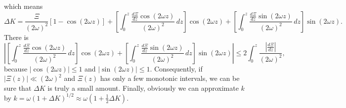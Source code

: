 \documentclass[
 jor,
 amsmath,amssymb,preprint,
]{revtex4-2}
\begin{document}
which means
\begin{equation}
    \Delta K=\frac{\Xi}{(2\omega)^2}[1-\cos(2\omega z)]+\left[\int_{0}^z\frac{\frac{d\Xi}{d z}\cos(2\omega z)}{(2\omega)^2}\,d z\right]\cos(2\omega z)+\left[\int_{0}^z\frac{\frac{d\Xi}{d z}\sin(2\omega z)}{(2\omega)^2}\,d z\right]\sin(2\omega z).
\end{equation}
There is
\begin{equation}
    \left\lvert \left[\int_{0}^z\frac{\frac{d\Xi}{d z}\cos(2\omega z)}{(2\omega)^2}\,d z\right]\cos(2\omega z)+\left[\int_{0}^z\frac{\frac{d\Xi}{d z}\sin(2\omega z)}{(2\omega)^2}\,d z\right]\sin(2\omega z)\right\rvert \leq 2\int_{0}^z\frac{\left\lvert \frac{d\Xi}{d z}\right\rvert }{(2\omega)^2},
\end{equation}
because $\left|\cos(2\omega z)\right|\leq1$ and $\left|\sin(2\omega z)\right|\leq1$. Consequently, if $\left|\Xi(z)\right|\ll(2\omega)^2$ and $\Xi(z)$ has only a few monotonic intervals, we can be sure that $\Delta K$ is truly a small amount. Finally, obviously we can approximate $k$ by $k=\omega(1+\Delta K)^{1/2}\approx \omega(1+\frac{1}{2}\Delta K)$.
\end{document}
